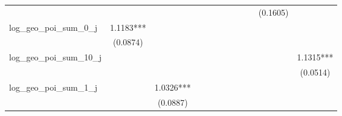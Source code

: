 \begin{table}
\begin{center}
\begin{tabular}{lccccccccccc}
                                &                       &                        &                         &                          &                           &                            &                             &                              &                               & (0.1605)                       &                                  \\
log\_geo\_poi\_sum\_0\_j        & 1.1183***             &                        &                         &                          &                           &                            &                             &                              &                               &                                &                                  \\
                                & (0.0874)              &                        &                         &                          &                           &                            &                             &                              &                               &                                &                                  \\
log\_geo\_poi\_sum\_10\_j       &                       &                        &                         &                          &                           &                            &                             &                              &                               &                                & 1.1315***                        \\
                                &                       &                        &                         &                          &                           &                            &                             &                              &                               &                                & (0.0514)                         \\
log\_geo\_poi\_sum\_1\_j        &                       & 1.0326***              &                         &                          &                           &                            &                             &                              &                               &                                &                                  \\
                                &                       & (0.0887)               &                         &                          &                           &                            &                             &                              &                               &                                &                                  \\

\end{tabular}
\end{center}
\end{table}
